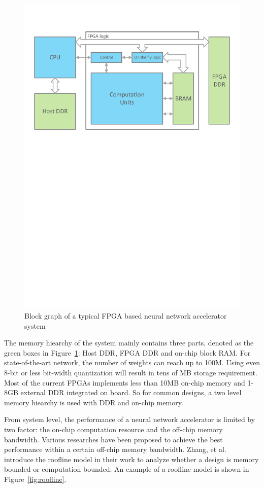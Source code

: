 \begin{figure}[t]
    \centering
    \includegraphics[width=0.8\columnwidth]{fig/sys.pdf}
    \caption{Block graph of a typical FPGA based neural network accelerator system}
    \label{fig:sys}
\end{figure}

The memory hiearchy of the system mainly contains three parts, denoted as the green boxes in Figure~\ref{fig:sys}: Host DDR, FPGA DDR and on-chip block RAM. For state-of-the-art network, the number of weights can reach up to 100M. Using even 8-bit or less bit-width quantization will result in tens of MB storage requirement. Most of the current FPGAs implements less than 10MB on-chip memory and 1-8GB external DDR integrated on board. So for common designs, a two level memory hiearchy is used with DDR and on-chip memory. 

From system level, the performance of a neural network accelerator is limited by two factor: the on-chip computation resource and the off-chip memory bandwidth. Various researches have been proposed to achieve the best performance within a certain off-chip memory bandwidth. Zhang, et al.~\cite{zhang2015optimizing} introduce the roofline model in their work to analyze whether a design is memory bounded or computation bounded. An example of a roofline model is shown in Figure~\ref{fig:roofline}.

